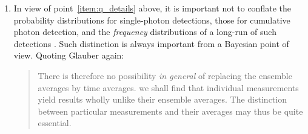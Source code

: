 \documentclass[\ifafour a4paper,12pt,\else a5paper,10pt,\fi%
onecolumn,oneside,article,%
british%
]{memoir}
\newcommand*{\defquote}[1]{`\,#1\,'}
\theoremstyle{remark}
\theoremstyle{innote}
\newcommand*{\citep}{\parencites}%
\newcommand*{\citey}{\parencites*}
\newcommand*{\amp}{\&}
\renewcommand*{\|}[1][]{\nonscript\,#1\vert\nonscript\;\mathopen{}}
\newcommand*{\sect}{\S}%
\newcommand*{\eqn}{eq.}%
\begin{document}
\begin{enumerate}[label=(\textbf{\roman*})]
\item\label{item:q_prob_freq} In view of point~\ref{item:q_details} above,
  it is important not to conflate the probability distributions for
  single-photon detections, those for cumulative photon detection, and the
  \emph{frequency} distributions of a long-run of such detections
  \citep[\sect~2, seem to conflate the two]{gelmanetal2020}. Such
  distinction is always important from a Bayesian point of view. Quoting
  Glauber \citey[Lect.~I p.~70]{glauber1965} again:
  \begin{quote}\footnotesize
    There is therefore no possibility \emph{in general} of replacing the
    ensemble averages by time averages. \textelp{} we shall find that
    individual measurements yield results wholly unlike their ensemble
    averages. The distinction between particular measurements and their
    averages may thus be quite essential.
  \end{quote}
%  



\end{enumerate}
\end{document}

